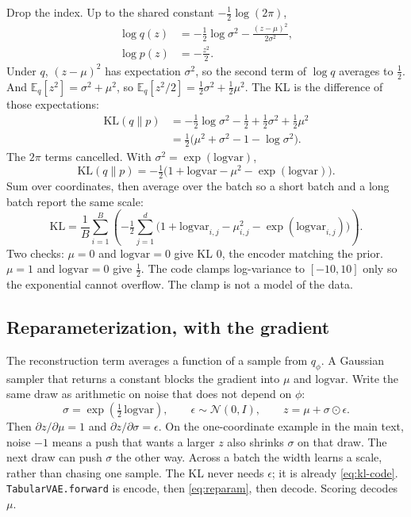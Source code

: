 \documentclass[11pt]{article}
\begin{document}
Drop the index. Up to the shared constant $-\tfrac{1}{2}\log(2\pi)$,
\begin{align*}
\log q(z)
&= -\tfrac{1}{2}\log \sigma^{2} - \frac{(z-\mu)^{2}}{2\sigma^{2}}, \\
\log p(z)
&= -\frac{z^{2}}{2}.
\end{align*}
Under $q$, $(z-\mu)^{2}$ has expectation $\sigma^{2}$, so the second term
of $\log q$ averages to $\tfrac{1}{2}$. And
$\mathbb{E}_{q}[z^{2}]=\sigma^{2}+\mu^{2}$, so
$\mathbb{E}_{q}[z^{2}/2]=\tfrac{1}{2}\sigma^{2}+\tfrac{1}{2}\mu^{2}$.
The KL is the difference of those expectations:
\begin{align*}
\mathrm{KL}(q\|p)
&= -\tfrac{1}{2}\log\sigma^{2} - \tfrac{1}{2}
   + \tfrac{1}{2}\sigma^{2} + \tfrac{1}{2}\mu^{2} \\
&= \tfrac{1}{2}\big(\mu^{2}+\sigma^{2}-1-\log\sigma^{2}\big).
\end{align*}
The $2\pi$ terms cancelled. With $\sigma^{2}=\exp(\mathrm{logvar})$,
\begin{equation}
\label{eq:kl-1d}
\mathrm{KL}(q\|p)
= -\tfrac{1}{2}\Big(1+\mathrm{logvar}-\mu^{2}-\exp(\mathrm{logvar})\Big).
\end{equation}
Sum over coordinates, then average over the batch so a short batch and a
long batch report the same scale:
\begin{equation}
\label{eq:kl-code}
\mathrm{KL}
= \frac{1}{B}\sum_{i=1}^{B}
\left(
-\tfrac{1}{2}\sum_{j=1}^{d}
\big(1+\mathrm{logvar}_{i,j}-\mu_{i,j}^{2}-\exp(\mathrm{logvar}_{i,j})\big)
\right).
\end{equation}
Two checks: $\mu=0$ and $\mathrm{logvar}=0$ give KL $0$, the encoder
matching the prior. $\mu=1$ and $\mathrm{logvar}=0$ give $\tfrac{1}{2}$.
The code clamps log-variance to $[-10,10]$ only so the exponential cannot
overflow. The clamp is not a model of the data.

\subsection{Reparameterization, with the gradient}

The reconstruction term averages a function of a sample from $q_{\phi}$.
A Gaussian sampler that returns a constant blocks the gradient into
$\mu$ and $\mathrm{logvar}$. Write the same draw as arithmetic on noise
that does not depend on $\phi$:
\begin{equation}
\label{eq:reparam}
\sigma=\exp\!\left(\tfrac{1}{2}\,\mathrm{logvar}\right),
\qquad
\epsilon\sim\mathcal{N}(0,I),
\qquad
z=\mu+\sigma\odot\epsilon.
\end{equation}
Then $\partial z/\partial\mu = 1$ and $\partial z/\partial\sigma = \epsilon$.
On the one-coordinate example in the main text, noise $-1$ means a push
that wants a larger $z$ also shrinks $\sigma$ on that draw. The next draw
can push $\sigma$ the other way. Across a batch the width learns a scale,
rather than chasing one sample. The KL never needs $\epsilon$; it is
already \eqref{eq:kl-code}. \texttt{TabularVAE.forward} is encode, then
\eqref{eq:reparam}, then decode. Scoring decodes $\mu$.
\end{document}
